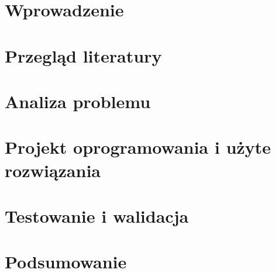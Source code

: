 \chapter{Wprowadzenie}


\chapter{Przegląd literatury}

%
\chapter{Analiza problemu}


\afterpage{\blankpage}
\chapter{Projekt oprogramowania i użyte rozwiązania}


\chapter{Testowanie i walidacja}


\chapter{Podsumowanie}
\label{ch:podsumowanie}

